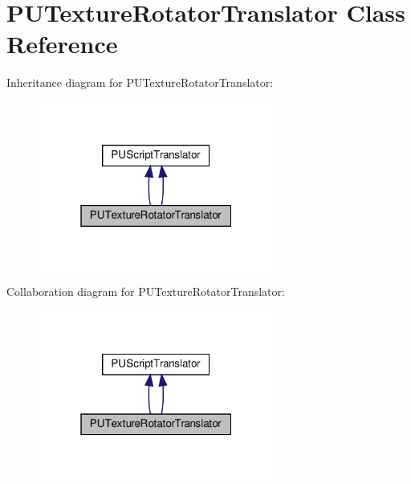 \hypertarget{classPUTextureRotatorTranslator}{}\section{P\+U\+Texture\+Rotator\+Translator Class Reference}
\label{classPUTextureRotatorTranslator}


Inheritance diagram for P\+U\+Texture\+Rotator\+Translator\+:
\nopagebreak
\begin{figure}[H]
\begin{center}
\leavevmode
\includegraphics[width=220pt]{classPUTextureRotatorTranslator__inherit__graph}
\end{center}
\end{figure}


Collaboration diagram for P\+U\+Texture\+Rotator\+Translator\+:
\nopagebreak
\begin{figure}[H]
\begin{center}
\leavevmode
\includegraphics[width=220pt]{classPUTextureRotatorTranslator__coll__graph}
\end{center}
\end{figure}
